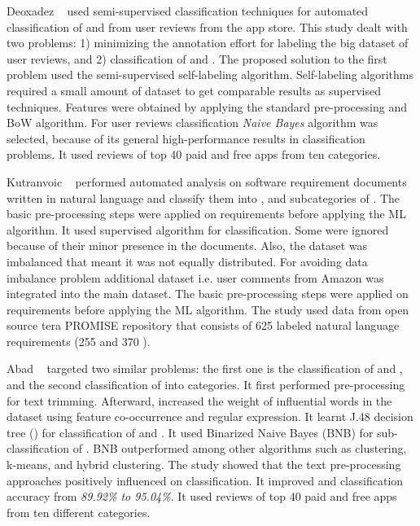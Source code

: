 	Deoxadez \etal~\cite{Deocadez:2017} used semi-supervised classification
techniques for automated classification of \FR and \NFR from user reviews from
the app store. This study dealt with two problems: 1) minimizing the annotation
effort for labeling the big dataset of user reviews, and 2) classification of
\FR and \NFR. The proposed solution to the first problem used
the semi-supervised self-labeling algorithm. Self-labeling algorithms required a
small amount of dataset to get comparable results as supervised techniques. Features were obtained
by applying the standard pre-processing and BoW algorithm. For user reviews classification \emph{Naive Bayes}
algorithm was selected, because of its general high-performance results in classification
problems. It used reviews of top 40 paid and free apps from ten categories.

	Kutranvoic \etal ~ \cite {Kurtanovic:2017} performed automated analysis on
software requirement documents written in natural language  and classify them into \FR,
\NFR and subcategories of \NFR. The basic pre-processing steps were applied on requirements before applying the ML algorithm. It used supervised \SVM algorithm for classification. Some \NFR were ignored because of their minor presence in the documents. Also, the dataset was imbalanced that meant it was not equally distributed. For avoiding data imbalance problem additional dataset i.e. user comments
from Amazon was integrated into the main dataset. The basic pre-processing steps were applied on requirements before applying the ML algorithm. The study used data from open source tera PROMISE repository that consists of 625 labeled natural language requirements (255 \FR
[40.8\%] and 370 \NFR[59.2\%]).

	Abad \etal ~ \cite{Abad:2017} targeted two similar problems: the first one is the classification of \FR and \NFR, and the second classification of \NFR into categories.
 It first performed pre-processing for text trimming. Afterward, increased the weight of influential words in the
dataset using feature co-occurrence and regular
expression. It learnt J.48 decision tree (\DT) for classification of \FRs and \NFR. It used Binarized Naive Bayes (BNB) for sub-classification of \NFR. BNB outperformed among other algorithms such as clustering, k-means, and hybrid clustering. 
The study showed that the text pre-processing approaches positively influenced on classification. It improved \FR and \NFR
 classification accuracy from \textit{89.92\% to 95.04\%}. It used reviews of top 40 paid and free apps from ten
different categories.

